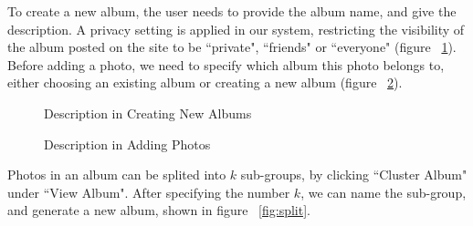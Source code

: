 \documentclass[10pt,twocolumn,letterpaper]{article}
\begin{document}
To create a new album, the user needs to provide the album name, and give the description. A privacy setting is applied in our system, restricting the visibility of the album posted on the site to be ``private", ``friends" or ``everyone" (figure ~\ref{fig:album}). Before adding a photo, we need to specify which album this photo belongs to, either choosing an existing album or creating a new album (figure ~\ref{fig:addphoto}).

\begin{figure}[t]
\begin{center}
\end{center}
\caption{Description in Creating New Albums}
\label{fig:album}
\end{figure}

\begin{figure}[t]
\begin{center}
\end{center}
\caption{Description in Adding Photos}
\label{fig:addphoto}
\end{figure}

Photos in an album can be splited into $k$ sub-groups, by clicking ``Cluster Album" under ``View Album". After specifying the number $k$, we can name the sub-group, and generate a new album, shown in figure ~\ref{fig:split}.
\end{document}
